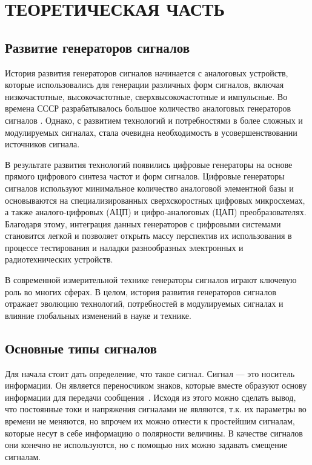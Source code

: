 \chapter{ТЕОРЕТИЧЕСКАЯ ЧАСТЬ}

\section{Развитие генераторов сигналов}
	История развития генераторов сигналов начинается с аналоговых устройств, которые
использовались для генерации различных форм сигналов, включая низкочастотные,
высокочастотные, сверхвысокочастотные и импульсные. Во времена СССР разрабатывалось большое количество аналоговых генераторов сигналов \cite{dgs}. Однако, с развитием технологий и потребностями в более сложных и модулируемых сигналах, стала очевидна необходимость в усовершенствовании источников сигнала.

	В результате развития технологий появились цифровые генераторы на основе прямого цифрового синтеза частот и форм сигналов. Цифровые генераторы сигналов используют минимальное количество аналоговой элементной базы и основываются на специализированных сверхскоростных цифровых микросхемах, а также аналого-цифровых (АЦП) и цифро-аналоговых (ЦАП) преобразователях. Благодаря этому, интеграция данных генераторов с цифровыми системами становится легкой и позволяет открыть массу перспектив их использования в процессе тестирования и наладки разнообразных электронных и радиотехнических устройств. 

	В современной измерительной технике генераторы сигналов играют ключевую роль во многих сферах. %
	В целом, история развития генераторов сигналов отражает эволюцию технологий, потребностей в модулируемых сигналах и влияние глобальных изменений в науке и технике.

\section{Основные типы сигналов}
	Для начала стоит дать определение, что такое сигнал. Сигнал --- это носитель информации. Он является переносчиком знаков, которые вместе образуют основу информации для передачи сообщения~\cite{dgs}. Исходя из этого можно сделать вывод, что постоянные токи и напряжения сигналами не являются, т.к. их параметры во времени не меняются, но впрочем их можно отнести к простейшим сигналам, которые несут в себе информацию о полярности величины. В качестве сигналов они конечно не используются, но с помощью них можно задавать смещение сигналам.


